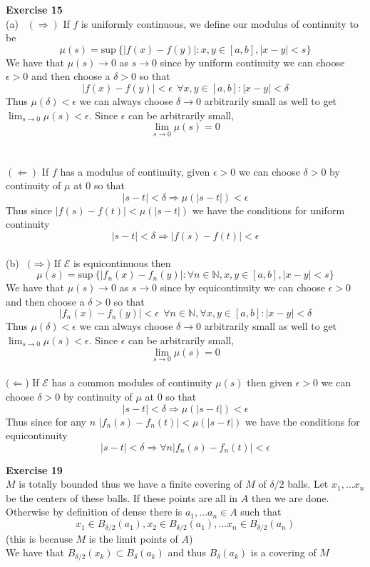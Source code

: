 \documentclass[12pt]{article}
\newenvironment{ques}[1]{\textbf{Exercise #1}\vspace{1 mm}\\ }{\bigskip}
\theoremstyle{definition}
\newcommand{\N}{\mathbb N}
\renewcommand{\sup}{\text{sup} \ }
\begin{document}
\begin{ques}{15}
	(a) \ 
	$(\Rightarrow)$ If $f$ is uniformly continuous, we define our modulus of
	continuity to be
	$$\mu(s) = \sup\{|f(x) - f(y)| : x,y \in [a,b], |x - y| < s\}$$
	We have that $\mu(s) \to 0$ as $s \to 0$ since by uniform continuity we can
	choose $\epsilon > 0$ and then choose a $\delta >0$ so that
	$$|f(x) - f(y)| < \epsilon \ \ \forall x,y \in [a,b]: |x-y| < \delta$$
	Thus $\mu(\delta) < \epsilon$ we can always choose $\delta \to 0$
	arbitrarily small as well to get $\lim_{s \to 0} \mu(s) < \epsilon$. Since
	$\epsilon$ can be arbitrarily small, $$\lim_{s \to 0} \mu(s) = 0 $$
	\\
	\\
	$(\Leftarrow)$ If $f$ has a modulus of continuity, given $\epsilon > 0$ we
	can choose $\delta > 0$ by continuity of $\mu$ at $0$ so that 
	$$|s-t| < \delta \Rightarrow \mu(|s-t|) < \epsilon$$
	Thus since $|f(s) - f(t)| < \mu(|s-t|)$ we have the conditions for uniform continuity
	$$|s-t| < \delta \Rightarrow |f(s) - f(t)| < \epsilon$$
	\\
	(b) \ $(\Rightarrow$) If $\mathcal E$ is equicontinuous then 
	$$\mu(s) = \sup\{|f_n(x) - f_n(y)| : \forall n \in \N, x,y \in [a,b], |x -
	y| < s\}$$
	We have that $\mu(s) \to 0$ as $s \to 0$ since by equicontinuity we can
	choose $\epsilon > 0$ and then choose a $\delta >0$ so that
	$$|f_n(x) - f_n(y)| < \epsilon \ \ \forall n \in \N, \forall x,y \in [a,b]:
	|x-y| < \delta$$
	Thus $\mu(\delta) < \epsilon$ we can always choose $\delta \to 0$
	arbitrarily small as well to get $\lim_{s \to 0} \mu(s) < \epsilon$. Since
	$\epsilon$ can be arbitrarily small, $$\lim_{s \to 0} \mu(s) = 0 $$
	\\
	$(\Leftarrow$) If $\mathcal E$ has a common modules of continuity $\mu(s)$ then
	given $\epsilon > 0$ we can choose $\delta > 0$ by continuity of $\mu$ at
	$0$ so that 
	$$|s-t| < \delta \Rightarrow \mu(|s-t|) < \epsilon$$
	Thus since for any $n$ $|f_n(s) - f_n(t)| < \mu(|s-t|)$ we have the conditions for
	equicontinuity
	$$|s-t| < \delta \Rightarrow \forall n |f_n(s) - f_n(t)| < \epsilon $$

\end{ques}

\begin{ques}{19}
	$M$ is totally bounded thus we have a finite covering of $M$ of $\delta/2$
	balls. Let $x_1, \dots x_n$ be the centers of these balls. If these points
	are all in $A$ then we are done. Otherwise by definition of dense there is
	$a_1, \dots a_n \in A$ such that 
	$$x_1 \in B_{\delta/2}(a_1), x_2 \in
	B_{\delta/2}(a_1), \dots x_n \in B_{\delta/2}(a_n)$$
	(this is because $M$ is the limit points of $A$)\\
	We have that $B_{\delta/2}(x_k) \subset B_\delta(a_k)$ and thus
	$B_\delta(a_k)$ is a covering of $M$
\end{ques}
\end{document}
